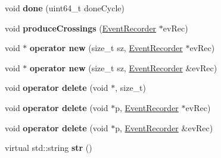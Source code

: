 \begin{DoxyCompactItemize}
\item 
\hypertarget{classTimingEvent_a9e2c0c90bd80d105616121374a7d33e1}{void {\bfseries done} (uint64\-\_\-t done\-Cycle)}\label{classTimingEvent_a9e2c0c90bd80d105616121374a7d33e1}

\item 
\hypertarget{classTimingEvent_a3ec74069d3a97dd192c171a79fef46a4}{void {\bfseries produce\-Crossings} (\hyperlink{classEventRecorder}{Event\-Recorder} $\ast$ev\-Rec)}\label{classTimingEvent_a3ec74069d3a97dd192c171a79fef46a4}

\item 
\hypertarget{classTimingEvent_a9ecb818af70278d593b7b3532aad03e2}{void $\ast$ {\bfseries operator new} (size\-\_\-t sz, \hyperlink{classEventRecorder}{Event\-Recorder} $\ast$ev\-Rec)}\label{classTimingEvent_a9ecb818af70278d593b7b3532aad03e2}

\item 
\hypertarget{classTimingEvent_accb87e44bcbb3a7c4393d4f64af87192}{void $\ast$ {\bfseries operator new} (size\-\_\-t sz, \hyperlink{classEventRecorder}{Event\-Recorder} \&ev\-Rec)}\label{classTimingEvent_accb87e44bcbb3a7c4393d4f64af87192}

\item 
\hypertarget{classTimingEvent_a9efd2a85ed47175399f6a751c109f8a9}{void {\bfseries operator delete} (void $\ast$, size\-\_\-t)}\label{classTimingEvent_a9efd2a85ed47175399f6a751c109f8a9}

\item 
\hypertarget{classTimingEvent_a51a820e571e6bec1fbc9ed0cb751726a}{void {\bfseries operator delete} (void $\ast$p, \hyperlink{classEventRecorder}{Event\-Recorder} $\ast$ev\-Rec)}\label{classTimingEvent_a51a820e571e6bec1fbc9ed0cb751726a}

\item 
\hypertarget{classTimingEvent_ac920ad0905f611841f49c6232947a02e}{void {\bfseries operator delete} (void $\ast$p, \hyperlink{classEventRecorder}{Event\-Recorder} \&ev\-Rec)}\label{classTimingEvent_ac920ad0905f611841f49c6232947a02e}

\item 
\hypertarget{classTimingEvent_ad918cf0b44a8d7298fa4b70b95d04bab}{virtual std\-::string {\bfseries str} ()}\label{classTimingEvent_ad918cf0b44a8d7298fa4b70b95d04bab}

\end{DoxyCompactItemize}
